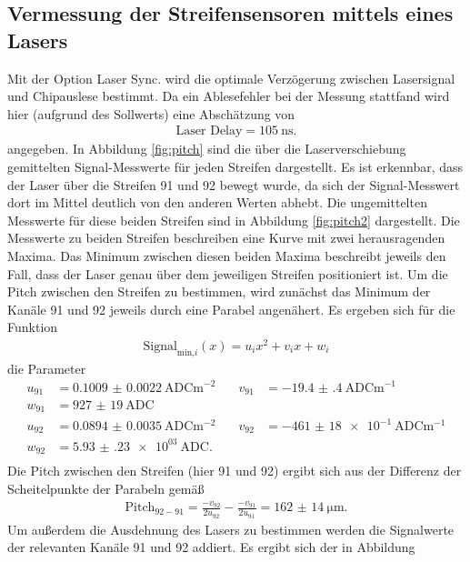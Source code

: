 \subsection{Vermessung der Streifensensoren mittels eines Lasers}

Mit der Option Laser Sync. wird die optimale Verzögerung zwischen Lasersignal und
Chipauslese bestimmt. Da ein Ablesefehler bei der Messung stattfand wird hier (aufgrund des Sollwerts) eine Abschätzung von
\begin{align}
  \text{Laser Delay} = \SI{105}{\nano\second}.
\end{align}
angegeben. In Abbildung \ref{fig:pitch} sind die über die Laserverschiebung gemittelten Signal-Messwerte für jeden Streifen
dargestellt. Es ist erkennbar, dass der Laser über die Streifen 91 und 92 bewegt wurde,
da sich der Signal-Messwert dort im Mittel deutlich von den anderen Werten abhebt.
Die ungemittelten Messwerte für diese beiden Streifen sind in Abbildung \ref{fig:pitch2} dargestellt.
Die Messwerte zu beiden Streifen beschreiben eine Kurve mit zwei herausragenden Maxima.
Das Minimum zwischen diesen beiden Maxima beschreibt jeweils den Fall, dass der Laser genau über dem jeweiligen
Streifen positioniert ist. Um die Pitch zwischen den Streifen zu bestimmen, wird zunächst das Minimum der Kanäle 91 und 92
jeweils durch eine Parabel angenähert. Es ergeben sich für die Funktion
\begin{align}
  \text{Signal}_{\text{min,}i}(x) = u_i x^2 + v_i x + w_i
\end{align}
die Parameter
\begin{align*}
  u_{91} &= \SI{0.1009(22)}{\text{ADC}\meter\tothe{-2}} &\quad v_{91} &= \SI{-19.4(4)}{\text{ADC}\meter\tothe{-1}} \\
  w_{91} &= \SI{927(19)}{\text{ADC}} &\quad \phantom{a} & \phantom{a} \\
  u_{92} &= \SI{0.0894(35)}{\text{ADC}\meter\tothe{-2}} &\quad v_{92} &= \SI{-461(18)e-1}{\text{ADC}\meter\tothe{-1}} \\
  w_{92} &= \SI{5.93(23)e03}{\text{ADC}}. &\quad \phantom{a} & \phantom{a} \\
\end{align*}
Die Pitch zwischen den Streifen (hier 91 und 92) ergibt sich aus der Differenz der Scheitelpunkte der Parabeln gemäß
\begin{align}
  \text{Pitch}_{92-91} = \frac{-v_{92}}{2u_{92}} - \frac{-v_{91}}{2u_{91}} = \SI{162(14)}{\micro\meter}.
\end{align}
Um außerdem die Ausdehnung des Lasers zu bestimmen werden die Signalwerte der relevanten Kanäle 91 und 92 addiert. Es ergibt sich der in Abbildung
